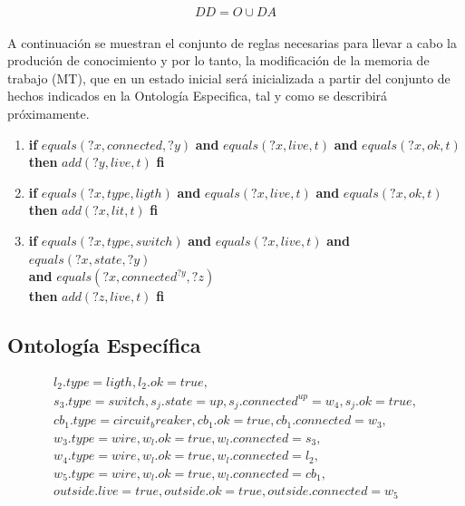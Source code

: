\documentclass[10pt, a4paper,spanish]{article}
\begin{document}
			\begin{equation*}
				DD = O \cup DA
			\end{equation*}

			\paragraph{}
			A continuación se muestran el conjunto de reglas necesarias para llevar a cabo la produción de conocimiento y por lo tanto, la modificación de la memoria de trabajo (MT), que en un estado inicial será inicializada a partir del conjunto de hechos indicados en la Ontología Especifica, tal y como se describirá próximamente.

			\begin{enumerate}[label={\textbf{R\theenumi:}}]
				\item
					\textbf{if} $equals(?x, connected, ?y)$ \textbf{and} $equals(?x, live, t)$ \textbf{and} $equals(?x, ok, t)$ \\
					\textbf{then} $add(?y, live, t)$ \textbf{fi}

				\item
					\textbf{if} $equals(?x, type, ligth)$ \textbf{and} $equals(?x, live, t)$ \textbf{and} $equals(?x, ok, t)$ \\
					\textbf{then} $add(?x, lit, t)$ \textbf{fi}

				\item
					\textbf{if} $equals(?x, type, switch)$ \textbf{and} $equals(?x, live, t)$ \textbf{and} $equals(?x, state, ?y)$ \\
					\hspace*{0.5cm} \textbf{and} $equals(?x, connected^{?y}, ?z)$ \\
					\textbf{then} $add(?z, live, t)$ \textbf{fi}

			\end{enumerate}


		\subsection{Ontología Específica}

			\begin{equation*}
				\begin{split}
					l_2.type=ligth, l_2.ok=true, \\
					s_3.type=switch, s_j.state=up, s_j.connected^{up}=w_4, s_j.ok=true, \\
					cb_1.type=circuit_breaker, cb_1.ok=true, cb_1.connected=w_3, \\
					w_3.type=wire, w_l.ok=true, w_l.connected=s_3, \\
					w_4.type=wire, w_l.ok=true, w_l.connected=l_2, \\
					w_5.type=wire, w_l.ok=true, w_l.connected=cb_1, \\
					outside.live=true, outside.ok=true, outside.connected=w_5
				\end{split}
			\end{equation*}
\end{document}
